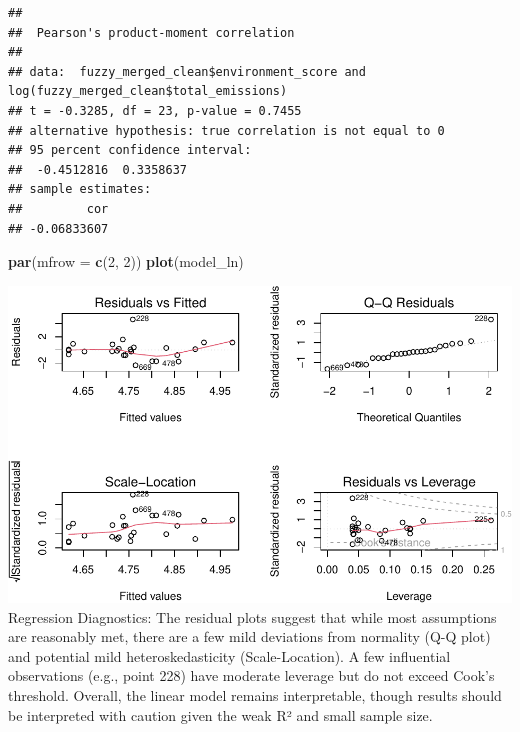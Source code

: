 \documentclass[
]{article}
\newenvironment{Shaded}{\begin{snugshade}}{\end{snugshade}}
\newcommand{\AttributeTok}[1]{\textcolor[rgb]{0.13,0.29,0.53}{#1}}
\newcommand{\DecValTok}[1]{\textcolor[rgb]{0.00,0.00,0.81}{#1}}
\newcommand{\FunctionTok}[1]{\textcolor[rgb]{0.13,0.29,0.53}{\textbf{#1}}}
\newcommand{\NormalTok}[1]{#1}
\newcommand{\SpecialCharTok}[1]{\textcolor[rgb]{0.81,0.36,0.00}{\textbf{#1}}}
\newcommand{\StringTok}[1]{\textcolor[rgb]{0.31,0.60,0.02}{#1}}
\begin{document}
\begin{Shaded}
\end{Shaded}

\begin{verbatim}
## 
##  Pearson's product-moment correlation
## 
## data:  fuzzy_merged_clean$environment_score and log(fuzzy_merged_clean$total_emissions)
## t = -0.3285, df = 23, p-value = 0.7455
## alternative hypothesis: true correlation is not equal to 0
## 95 percent confidence interval:
##  -0.4512816  0.3358637
## sample estimates:
##         cor 
## -0.06833607
\end{verbatim}

\begin{Shaded}
\begin{Highlighting}[]
\FunctionTok{par}\NormalTok{(}\AttributeTok{mfrow =} \FunctionTok{c}\NormalTok{(}\DecValTok{2}\NormalTok{, }\DecValTok{2}\NormalTok{))}
\FunctionTok{plot}\NormalTok{(model\_ln)}
\end{Highlighting}
\end{Shaded}

\includegraphics{ESG-code_files/figure-latex/diagnostics-1.pdf}
Regression Diagnostics: The residual plots suggest that while most
assumptions are reasonably met, there are a few mild deviations from
normality (Q-Q plot) and potential mild heteroskedasticity
(Scale-Location). A few influential observations (e.g., point 228) have
moderate leverage but do not exceed Cook's threshold. Overall, the
linear model remains interpretable, though results should be interpreted
with caution given the weak R² and small sample size.
\end{document}
